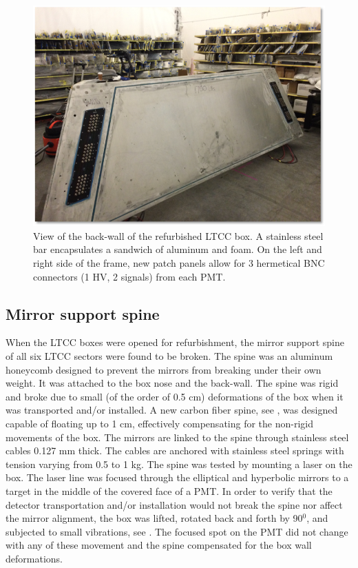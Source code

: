 \begin{figure}
	\centering
	\includegraphics[width=0.95\columnwidth,keepaspectratio]{img/backWall.png}
	\caption{View of the back-wall of the refurbished LTCC box. A stainless steel bar encapsulates a sandwich
             of aluminum and foam. On the left and right side of the frame, new patch panels allow for 3 hermetical
             BNC connectors (1 HV, 2 signals) from each PMT. }
	\label{fig:backWall}
\end{figure}


\subsection{Mirror support spine}

When the LTCC boxes were opened for refurbishment, the mirror support spine of all six LTCC sectors were found to be broken.
The spine was an aluminum honeycomb designed to prevent the mirrors from breaking under their own weight.
It was attached to the box nose and the back-wall. The spine was rigid and broke due to small
(of the order of 0.5 cm) deformations of the box when it was transported and/or installed.
A new carbon fiber spine, see , was designed capable of floating up to 1 cm, effectively compensating
for the non-rigid movements of the box.
The mirrors are linked to the spine through stainless steel cables 0.127 mm thick.
The cables are anchored with stainless steel springs with tension varying from 0.5 to 1 kg.
The spine was tested by mounting a laser on the box. The laser line was focused through the elliptical
and hyperbolic mirrors to a target in the middle of the covered face of a PMT.
In order to verify that the detector transportation and/or installation would not break the spine
nor affect the mirror alignment, the box was lifted, rotated back and forth by 90$^0$, and subjected
to small vibrations, see . The focused spot on the PMT did not change with any of these movement and the spine
compensated for the box wall deformations.

